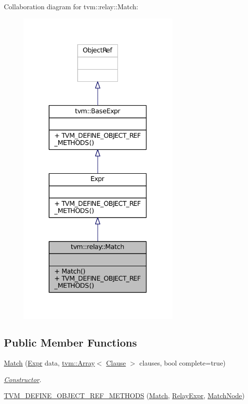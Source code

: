 Collaboration diagram for tvm\+:\+:relay\+:\+:Match\+:
\nopagebreak
\begin{figure}[H]
\begin{center}
\leavevmode
\includegraphics[width=230pt]{classtvm_1_1relay_1_1Match__coll__graph}
\end{center}
\end{figure}
\subsection*{Public Member Functions}
\begin{DoxyCompactItemize}
\item 
\hyperlink{classtvm_1_1relay_1_1Match_adde0178e9f26be31bdf1dce1367a788d}{Match} (\hyperlink{namespacetvm_1_1relay_a5b84e3790f89bb3fad5c7911eeb99531}{Expr} data, \hyperlink{classtvm_1_1Array}{tvm\+::\+Array}$<$ \hyperlink{classtvm_1_1relay_1_1Clause}{Clause} $>$ clauses, bool complete=true)
\begin{DoxyCompactList}\small\item\em \hyperlink{classtvm_1_1Constructor}{Constructor}. \end{DoxyCompactList}\item 
\hyperlink{classtvm_1_1relay_1_1Match_aa8801e076c940b77335004f7bfa5d8ec}{T\+V\+M\+\_\+\+D\+E\+F\+I\+N\+E\+\_\+\+O\+B\+J\+E\+C\+T\+\_\+\+R\+E\+F\+\_\+\+M\+E\+T\+H\+O\+DS} (\hyperlink{classtvm_1_1relay_1_1Match}{Match}, \hyperlink{classtvm_1_1RelayExpr}{Relay\+Expr}, \hyperlink{classtvm_1_1relay_1_1MatchNode}{Match\+Node})
\end{DoxyCompactItemize}


